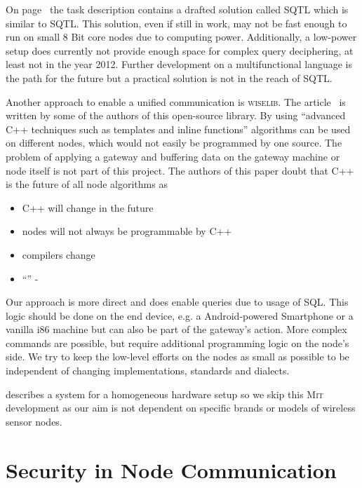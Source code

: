 On page~\pageref{chap:unify} the task description contains a drafted solution called \textsc{SQTL} which is similar to \textsc{SQTL}. This
solution, even if still in work, may not be fast enough to run on small 8 Bit core nodes due to computing power. Additionally, a low-power 
setup does currently not provide enough space for complex query deciphering, at least not in the year 2012. Further development on a 
multifunctional language is the path for the future but a practical solution is not in the reach of \textsc{SQTL}.

Another approach to enable a unified communication is \textsc{wiselib}. The article~\cite{wiselib} is written by some of the authors of this
open-source library. By using ``advanced C++ techniques such as templates and inline functions'' algorithms can be used on different nodes,
which would not easily be programmed by one source. The problem of applying a gateway and buffering data on the gateway machine or node itself
is not part of this project. The authors of this paper doubt that C++ is the future of all node algorithms as

\begin{itemize}
    \item C++ will change in the future
    \item nodes will not always be programmable by C++
    \item compilers change
    \item ``'' - 
\end{itemize}

Our approach is more direct and does enable queries due to usage of \textsc{SQL}. 
This logic should be done on the end device, e.g. a Android-powered Smartphone or a 
vanilla i86 machine but can also be part of the gateway's action. 
More complex commands are possible, but require additional programming logic on the node's side. We try to 
keep the low-level efforts on the nodes as small as possible to be independent of changing implementations, standards and dialects.

\cite{Heinzelman00energy-efficientcommunication} describes a system for a homogeneous hardware setup so we skip this \textsc{Mit} development as 
our aim is not dependent on specific brands or models of wireless sensor nodes.

\section{Security in Node Communication}

